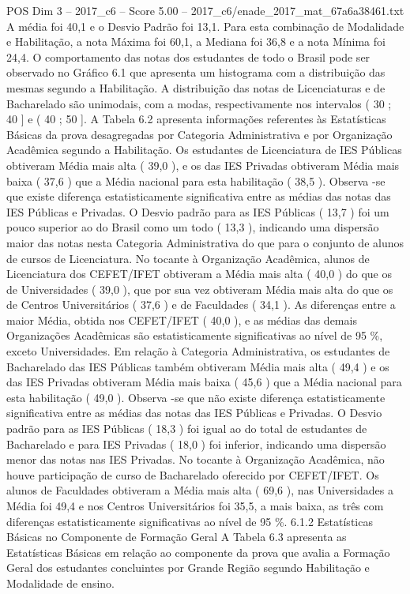 \begin{textsample}{POS Dim 3 – 2017\_c6 – Score 5.00 – 2017\_c6/enade\_2017\_mat\_67a6a38461.txt}
A média foi 40,1 e o Desvio Padrão foi 13,1.
Para esta combinação de Modalidade e Habilitação, a nota Máxima foi 60,1, a Mediana foi 36,8 e a nota Mínima foi 24,4.
O comportamento das notas dos estudantes de todo o Brasil pode ser observado no Gráfico 6.1 que apresenta um histograma com a distribuição das mesmas segundo a Habilitação.
A distribuição das notas de Licenciaturas e de Bacharelado são unimodais, com a modas, respectivamente nos intervalos ( 30 ; 40 ] e ( 40 ; 50 ].
A Tabela 6.2 apresenta informações referentes às Estatísticas Básicas da prova desagregadas por Categoria Administrativa e por Organização Acadêmica segundo a Habilitação.
Os estudantes de Licenciatura de IES Públicas obtiveram Média mais alta ( 39,0 ), e os das IES Privadas obtiveram Média mais baixa ( 37,6 ) que a Média nacional para esta habilitação ( 38,5 ).
Observa -se que existe diferença estatisticamente significativa entre as médias das notas das IES Públicas e Privadas.
O Desvio padrão para as IES Públicas ( 13,7 ) foi um pouco superior ao do Brasil como um todo ( 13,3 ), indicando uma dispersão maior das notas nesta Categoria Administrativa do que para o conjunto de alunos de cursos de Licenciatura.
No tocante à Organização Acadêmica, alunos de Licenciatura dos CEFET/IFET obtiveram a Média mais alta ( 40,0 ) do que os de Universidades ( 39,0 ), que por sua vez obtiveram Média mais alta do que os de Centros Universitários ( 37,6 ) e de Faculdades ( 34,1 ).
As diferenças entre a maior Média, obtida nos CEFET/IFET ( 40,0 ), e as médias das demais Organizações Acadêmicas são estatisticamente significativas ao nível de 95 \%, exceto Universidades.
Em relação à Categoria Administrativa, os estudantes de Bacharelado das IES Públicas também obtiveram Média mais alta ( 49,4 ) e os das IES Privadas obtiveram Média mais baixa ( 45,6 ) que a Média nacional para esta habilitação ( 49,0 ).
Observa -se que não existe diferença estatisticamente significativa entre as médias das notas das IES Públicas e Privadas.
O Desvio padrão para as IES Públicas ( 18,3 ) foi igual ao do total de estudantes de Bacharelado e para IES Privadas ( 18,0 ) foi inferior, indicando uma dispersão menor das notas nas IES Privadas.
No tocante à Organização Acadêmica, não houve participação de curso de Bacharelado oferecido por CEFET/IFET.
Os alunos de Faculdades obtiveram a Média mais alta ( 69,6 ), nas Universidades a Média foi 49,4 e nos Centros Universitários foi 35,5, a mais baixa, as três com diferenças estatisticamente significativas ao nível de 95 \%. 6.1.2 Estatísticas Básicas no Componente de Formação Geral A Tabela 6.3 apresenta as Estatísticas Básicas em relação ao componente da prova que avalia a Formação Geral dos estudantes concluintes por Grande Região segundo Habilitação e Modalidade de ensino.

\end{textsample}
